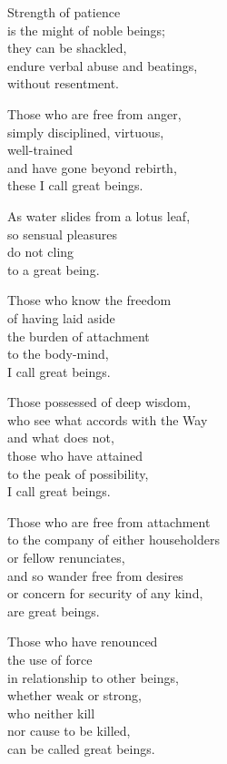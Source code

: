 Strength of patience\\
is the might of noble beings;\\
they can be shackled,\\
endure verbal abuse and beatings,\\
without resentment.

Those who are free from anger,\\
simply disciplined, virtuous,\\
well-trained\\
and have gone beyond rebirth,\\
these I call great beings.


As water slides from a lotus leaf,\\
so sensual pleasures\\
do not cling\\
to a great being.


Those who know the freedom\\
of having laid aside\\
the burden of attachment\\
to the body-mind,\\
I call great beings.


Those possessed of deep wisdom,\\
who see what accords with the Way\\
and what does not,\\
those who have attained\\
to the peak of possibility,\\
I call great beings.


Those who are free from attachment\\
to the company of either householders\\
or fellow renunciates,\\
and so wander free from desires\\
or concern for security of any kind,\\
are great beings.


Those who have renounced\\
the use of force\\
in relationship to other beings,\\
whether weak or strong,\\
who neither kill\\
nor cause to be killed,\\
can be called great beings.



